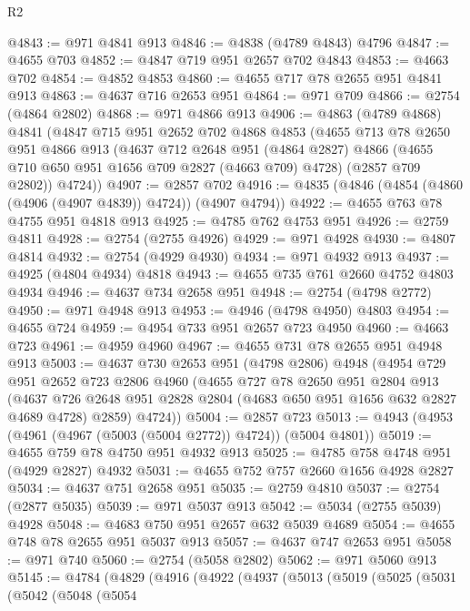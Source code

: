 \begin{lexlean}{R2}
\begin{coremodule}
@4843 := @971 @4841 @913
@4846 := @4838 (@4789 @4843) @4796
@4847 := @4655 @703
@4852 := @4847 @719 @951 @2657 @702 @4843
@4853 := @4663 @702
@4854 := @4852 @4853
@4860 := @4655 @717 @78 @2655 @951 @4841 @913
@4863 := @4637 @716 @2653 @951
@4864 := @971 @709
@4866 := @2754 (@4864 @2802)
@4868 := @971 @4866 @913
@4906 := @4863
    (@4789 @4868)
    @4841
    (@4847
      @715
      @951
      @2652
      @702
      @4868
      @4853
      (@4655
        @713
        @78
        @2650
        @951
        @4866
        @913
        (@4637
          @712
          @2648
          @951
          (@4864 @2827)
          @4866
          (@4655 @710 @650 @951 @1656 @709 @2827 (@4663 @709) @4728)
          (@2857 @709 @2802))
        @4724))
@4907 := @2857 @702
@4916 := @4835 (@4846 (@4854 (@4860 (@4906 (@4907 @4839)) @4724)) (@4907 @4794))
@4922 := @4655 @763 @78 @4755 @951 @4818 @913
@4925 := @4785 @762 @4753 @951
@4926 := @2759 @4811
@4928 := @2754 (@2755 @4926)
@4929 := @971 @4928
@4930 := @4807 @4814
@4932 := @2754 (@4929 @4930)
@4934 := @971 @4932 @913
@4937 := @4925 (@4804 @4934) @4818
@4943 := @4655 @735 @761 @2660 @4752 @4803 @4934
@4946 := @4637 @734 @2658 @951
@4948 := @2754 (@4798 @2772)
@4950 := @971 @4948 @913
@4953 := @4946 (@4798 @4950) @4803
@4954 := @4655 @724
@4959 := @4954 @733 @951 @2657 @723 @4950
@4960 := @4663 @723
@4961 := @4959 @4960
@4967 := @4655 @731 @78 @2655 @951 @4948 @913
@5003 := @4637
    @730
    @2653
    @951
    (@4798 @2806)
    @4948
    (@4954
      @729
      @951
      @2652
      @723
      @2806
      @4960
      (@4655
        @727
        @78
        @2650
        @951
        @2804
        @913
        (@4637 @726 @2648 @951 @2828 @2804 (@4683 @650 @951 @1656 @632 @2827 @4689 @4728) @2859)
        @4724))
@5004 := @2857 @723
@5013 := @4943 (@4953 (@4961 (@4967 (@5003 (@5004 @2772)) @4724)) (@5004 @4801))
@5019 := @4655 @759 @78 @4750 @951 @4932 @913
@5025 := @4785 @758 @4748 @951 (@4929 @2827) @4932
@5031 := @4655 @752 @757 @2660 @1656 @4928 @2827
@5034 := @4637 @751 @2658 @951
@5035 := @2759 @4810
@5037 := @2754 (@2877 @5035)
@5039 := @971 @5037 @913
@5042 := @5034 (@2755 @5039) @4928
@5048 := @4683 @750 @951 @2657 @632 @5039 @4689
@5054 := @4655 @748 @78 @2655 @951 @5037 @913
@5057 := @4637 @747 @2653 @951
@5058 := @971 @740
@5060 := @2754 (@5058 @2802)
@5062 := @971 @5060 @913
@5145 := @4784
    (@4829
      (@4916
        (@4922
          (@4937
            (@5013
              (@5019
                (@5025
                  (@5031
                    (@5042
                      (@5048
                        (@5054

\end{coremodule}
\end{lexlean}
